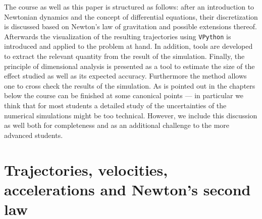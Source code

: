 \documentclass[12pt,ngerman,american]{iopart}
\newcommand{\vpython}[0]{\texttt{VPython}}
\begin{document}
The course as well as this paper is structured as follows: after an introduction to Newtonian dynamics and the concept of differential equations, their
discretization is discussed based on Newton's law of gravitation and possible extensions thereof.
Afterwards the visualization of the resulting trajectories using \vpython{} is introduced and applied to the problem at hand. In addition, tools are developed to extract the relevant quantity from the result of the simulation.
Finally, the principle of dimensional analysis is presented as a tool to estimate the size of the effect studied as well as its expected accuracy.
Furthermore the method allows one to cross check the results of the simulation.
As is pointed out in the chapters below the course can be finished at some canonical points --- in particular we think
that for most students a detailed study of the uncertainties of the numerical simulations might be too technical.
However, we include this discussion as well both for completeness and as an additional challenge to the more advanced students.



\section{Trajectories, velocities, accelerations and Newton's second law}\label{sec:tva}
\end{document}
